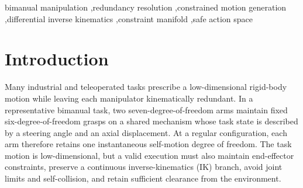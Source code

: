 \documentclass[preprint,12pt]{elsarticle}
\begin{document}
\begin{frontmatter}
%

\begin{keyword}
bimanual manipulation \sep redundancy resolution \sep constrained motion generation \sep differential inverse kinematics \sep constraint manifold \sep safe action space
\end{keyword}

\end{frontmatter}

\section{Introduction}
\label{sec:introduction}

Many industrial and teleoperated tasks prescribe a low-dimensional rigid-body motion while leaving each manipulator kinematically redundant. In a representative bimanual task, two seven-degree-of-freedom arms maintain fixed six-degree-of-freedom grasps on a shared mechanism whose task state is described by a steering angle and an axial displacement. At a regular configuration, each arm therefore retains one instantaneous self-motion degree of freedom. The task motion is low-dimensional, but a valid execution must also maintain end-effector constraints, preserve a continuous inverse-kinematics (IK) branch, avoid joint limits and self-collision, and retain sufficient clearance from the environment.
\end{document}
